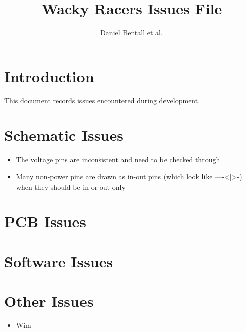 \documentclass[10pt]{article}
\begin{document}
\title{Wacky Racers Issues File}
\author{Daniel Bentall et al.}
\maketitle

\section{Introduction}
This document records issues encountered during development. 

\section{Schematic Issues}
\begin{itemize}
\item The voltage pins are inconsistent and need to be checked through
\item Many non-power pins are drawn as in-out pins (which look like ----<|>-) when they should be in or out only
\end{itemize}

\section{PCB Issues}

\section{Software Issues}

\section{Other Issues}

\begin{itemize}
\item Wim
\end{itemize}
\end{document}
